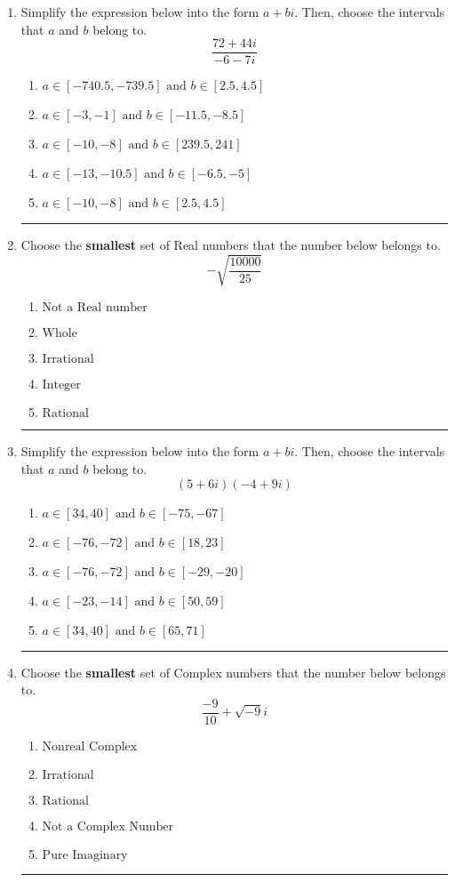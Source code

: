 \documentclass[14pt]{extbook}
\newcommand{\litem}[1]{\item#1\hspace*{-1cm}\rule{\textwidth}{0.4pt}}
\begin{document}
\begin{enumerate}
\litem{
Simplify the expression below into the form $a+bi$. Then, choose the intervals that $a$ and $b$ belong to.\[ \frac{72 + 44 i}{-6 - 7 i} \]\begin{enumerate}[label=\Alph*.]
\item \( a \in [-740.5, -739.5] \text{ and } b \in [2.5, 4.5] \)
\item \( a \in [-3, -1] \text{ and } b \in [-11.5, -8.5] \)
\item \( a \in [-10, -8] \text{ and } b \in [239.5, 241] \)
\item \( a \in [-13, -10.5] \text{ and } b \in [-6.5, -5] \)
\item \( a \in [-10, -8] \text{ and } b \in [2.5, 4.5] \)

\end{enumerate} }
\litem{
Choose the \textbf{smallest} set of Real numbers that the number below belongs to.\[ -\sqrt{\frac{10000}{25}} \]\begin{enumerate}[label=\Alph*.]
\item \( \text{Not a Real number} \)
\item \( \text{Whole} \)
\item \( \text{Irrational} \)
\item \( \text{Integer} \)
\item \( \text{Rational} \)

\end{enumerate} }
\litem{
Simplify the expression below into the form $a+bi$. Then, choose the intervals that $a$ and $b$ belong to.\[ (5 + 6 i)(-4 + 9 i) \]\begin{enumerate}[label=\Alph*.]
\item \( a \in [34, 40] \text{ and } b \in [-75, -67] \)
\item \( a \in [-76, -72] \text{ and } b \in [18, 23] \)
\item \( a \in [-76, -72] \text{ and } b \in [-29, -20] \)
\item \( a \in [-23, -14] \text{ and } b \in [50, 59] \)
\item \( a \in [34, 40] \text{ and } b \in [65, 71] \)

\end{enumerate} }
\litem{
Choose the \textbf{smallest} set of Complex numbers that the number below belongs to.\[ \frac{-9}{10}+\sqrt{-9}i \]\begin{enumerate}[label=\Alph*.]
\item \( \text{Nonreal Complex} \)
\item \( \text{Irrational} \)
\item \( \text{Rational} \)
\item \( \text{Not a Complex Number} \)
\item \( \text{Pure Imaginary} \)


\end{enumerate}}
\end{enumerate}
\end{document}
